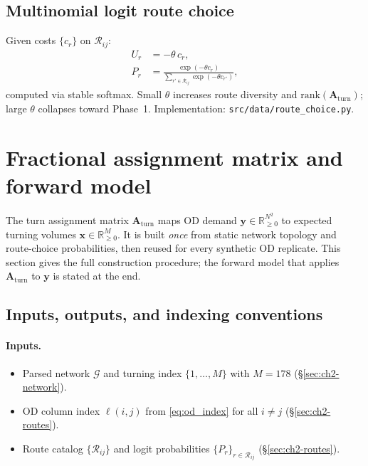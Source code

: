 \documentclass[11pt,a4paper]{report}
\newcommand{\mathbfy}{\mathbf{y}}
\newcommand{\mathbfx}{\mathbf{x}}
\newcommand{\Aturn}{\mathbf{A}_{\mathrm{turn}}}
\begin{document}
\subsection{Multinomial logit route choice}

Given costs $\{c_r\}$ on $\mathcal{R}_{ij}$:
\begin{align}
    U_r &= -\theta\, c_r, \label{eq:utility}\\
    P_r &= \frac{\exp(-\theta c_r)}{\sum_{r'\in\mathcal{R}_{ij}} \exp(-\theta c_{r'})},
    \label{eq:logit}
\end{align}
computed via stable softmax. Small $\theta$ increases route diversity and $\mathrm{rank}(\Aturn)$; large $\theta$ collapses toward Phase~1. Implementation: \texttt{src/data/route\_choice.py}.


\section{Fractional assignment matrix and forward model}
\label{sec:ch2-assignment}

The turn assignment matrix $\Aturn$ maps OD demand $\mathbfy\in\mathbb{R}_{\ge 0}^{N^2}$ to expected turning volumes $\mathbfx\in\mathbb{R}_{\ge 0}^{M}$. It is built \emph{once} from static network topology and route-choice probabilities, then reused for every synthetic OD replicate. This section gives the full construction procedure; the forward model that applies $\Aturn$ to $\mathbfy$ is stated at the end.


\subsection{Inputs, outputs, and indexing conventions}
\label{sec:ch2-aturn-io}

\paragraph{Inputs.}
\begin{itemize}[nosep]
    \item Parsed network $\mathcal{G}$ and turning index $\{1,\ldots,M\}$ with $M=178$ (\S\ref{sec:ch2-network}).
    \item OD column index $\ell(i,j)$ from \eqref{eq:od_index} for all $i\neq j$ (\S\ref{sec:ch2-routes}).
    \item Route catalog $\{\mathcal{R}_{ij}\}$ and logit probabilities $\{P_r\}_{r\in\mathcal{R}_{ij}}$ (\S\ref{sec:ch2-routes}).
\end{itemize}
\end{document}
